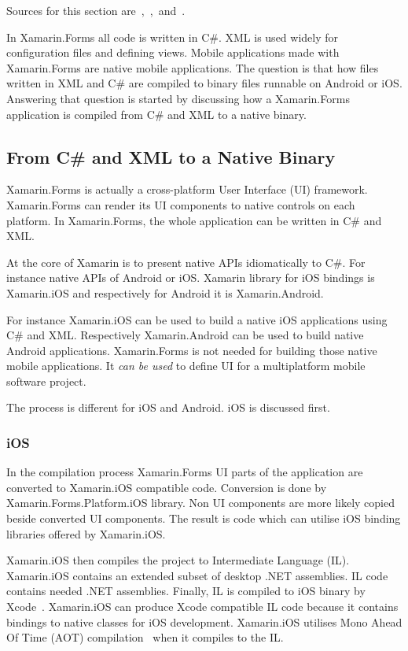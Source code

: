 \documentclass[conference]{IEEEtran}
\begin{document}
Sources for this section are~\cite{xamarin},~\cite{xamarin2},~and~\cite{xamarin3}. 

In Xamarin.Forms all code is written in C\#. XML is used widely for configuration files and defining views. Mobile applications made with Xamarin.Forms are native mobile applications. The question is that how files written in XML and C\# are compiled to binary files runnable on Android or iOS. Answering that question is started by discussing how a Xamarin.Forms application is compiled from C\# and XML to a native binary.

\subsection{From C\# and XML to a Native Binary}

Xamarin.Forms is actually a cross-platform User Interface (UI) framework. Xamarin.Forms can render its UI components to native controls on each platform. In Xamarin.Forms, the whole application can be written in C\# and XML.

At the core of Xamarin is to present native APIs idiomatically to C\#. For instance native APIs of Android or iOS. Xamarin library for iOS bindings is Xamarin.iOS and respectively for Android it is Xamarin.Android.

For instance Xamarin.iOS can be used to build a native iOS applications using C\# and XML. Respectively Xamarin.Android can be used to build native Android applications. Xamarin.Forms is not needed for building those native mobile applications. It \emph{can be used} to define UI for a multiplatform mobile software project.

The process is different for iOS and Android. iOS is discussed first.

\subsubsection{iOS}

In the compilation process Xamarin.Forms UI parts of the application are converted to Xamarin.iOS compatible code. Conversion is done by Xamarin.Forms.Platform.iOS library. Non UI components are more likely copied beside converted UI components. The result is code which can utilise iOS binding libraries offered by Xamarin.iOS.

Xamarin.iOS then compiles the project to Intermediate Language (IL). Xamarin.iOS contains an extended subset of desktop .NET assemblies. IL code contains needed .NET assemblies. Finally, IL is compiled to iOS binary by Xcode~\cite{xcode}. Xamarin.iOS can produce Xcode compatible IL code because it contains bindings to native classes for iOS development. Xamarin.iOS utilises Mono Ahead Of Time (AOT) compilation~\cite{mono_aot} when it compiles to the IL.
\end{document}
